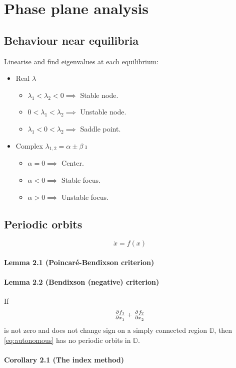 \section{Phase plane analysis}

\subsection{Behaviour near equilibria}
Linearise and find eigenvalues at each equilibrium:
\begin{itemize}
	\item Real $\lambda$
	\begin{itemize}
		\item $\lambda_1 < \lambda_2 < 0 \implies$ Stable node.
		\item $0 < \lambda_1 < \lambda_2 \implies$ Unstable node.
		\item $\lambda_1 < 0 < \lambda_2 \implies$ Saddle point.
	\end{itemize}
	\item Complex $\lambda_{1,2} = \alpha \pm \beta \imath$
	\begin{itemize}
		\item $\alpha = 0 \implies$ Center.
		\item $\alpha < 0 \implies$ Stable focus.
		\item $\alpha > 0 \implies$ Unstable focus.
	\end{itemize}
\end{itemize}

\subsection{Periodic orbits}
\begin{equation}\label{eq:autonomous}
	\dot{x} = f(x)
\end{equation}

\paragraph{Lemma 2.1 (Poincaré-Bendixson criterion)}

\paragraph{Lemma 2.2 (Bendixson (negative) criterion)}
If
\begin{equation}
	\pd{f_1}{x_1} + \pd{f_2}{x_2}
\end{equation}
is not zero and does not change sign on a simply connected region $\mathbb{D}$, then \eqref{eq:autonomous} has no periodic orbits in $\mathbb{D}$.

\paragraph{Corollary 2.1 (The index method)}